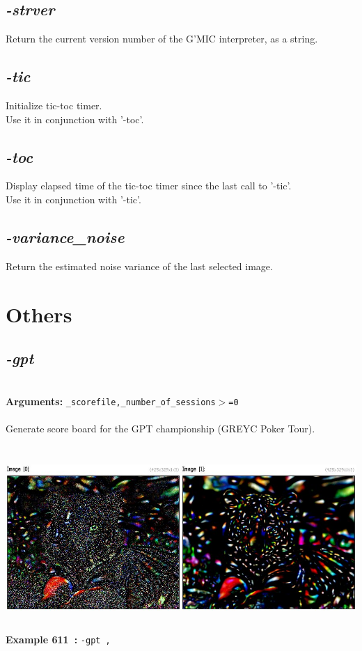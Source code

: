 \documentclass[a4paper,11pt,twoside]{book}
\begin{document}
\subsection{\emph{-strver} }\vspace*{-0.5em}
Return the current version number of the G'MIC interpreter, as a string.


\subsection{\emph{-tic} }\vspace*{-0.5em}
Initialize tic-toc timer.
~\\Use it in conjunction with '-toc'.


\subsection{\emph{-toc} }\vspace*{-0.5em}
Display elapsed time of the tic-toc timer since the last call to '-tic'.
~\\Use it in conjunction with '-tic'.


\subsection{\emph{-variance\_noise} }\vspace*{-0.5em}
Return the estimated noise variance of the last selected image.

\section{Others}


\subsection{\emph{-gpt} }\vspace*{-0.5em}
~\\\textbf{Arguments: } 
{\small \texttt{\_scorefile,\_number\_of\_sessions$>$=0}}\\~\\
Generate score board for the GPT championship (GREYC Poker Tour).
\begin{center}\includegraphics[keepaspectratio=true,height=7cm,width=\textwidth]{img/gmic_def611.jpg}\\
{\footnotesize \textbf{Example 611~:} \texttt{-gpt ,}}
\end{center}
\end{document}
